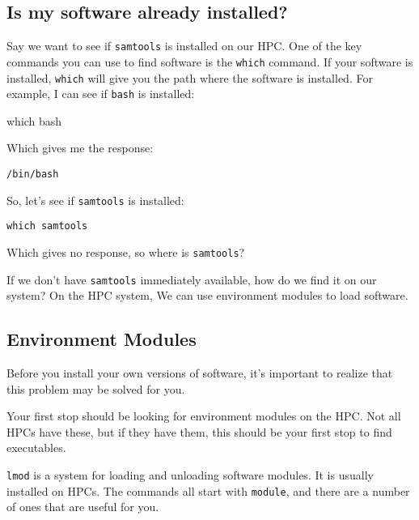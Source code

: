 \documentclass[
  letterpaper,
  DIV=11,
  numbers=noendperiod]{scrreprt}
\newenvironment{Shaded}{\begin{snugshade}}{\end{snugshade}}
\newcommand{\FunctionTok}[1]{\textcolor[rgb]{0.28,0.35,0.67}{#1}}
\newcommand{\NormalTok}[1]{\textcolor[rgb]{0.00,0.23,0.31}{#1}}
\begin{document}
\subsection{Is my software already
installed?}\label{is-my-software-already-installed}

Say we want to see if \texttt{samtools} is installed on our HPC. One of
the key commands you can use to find software is the \texttt{which}
command. If your software is installed, \texttt{which} will give you the
path where the software is installed. For example, I can see if
\texttt{bash} is installed:

\begin{Shaded}
\begin{Highlighting}[]
\FunctionTok{which}\NormalTok{ bash}
\end{Highlighting}
\end{Shaded}

Which gives me the response:

\begin{verbatim}
/bin/bash
\end{verbatim}

So, let's see if \texttt{samtools} is installed:

\begin{verbatim}
which samtools
\end{verbatim}

Which gives no response, so where is \texttt{samtools}?

If we don't have \texttt{samtools} immediately available, how do we find
it on our system? On the HPC system, We can use environment modules to
load software.

\subsection{Environment Modules}\label{environment-modules}

Before you install your own versions of software, it's important to
realize that this problem may be solved for you.

Your first stop should be looking for environment modules on the HPC.
Not all HPCs have these, but if they have them, this should be your
first stop to find executables.

\texttt{lmod} is a system for loading and unloading software modules. It
is usually installed on HPCs. The commands all start with
\texttt{module}, and there are a number of ones that are useful for you.
\end{document}

